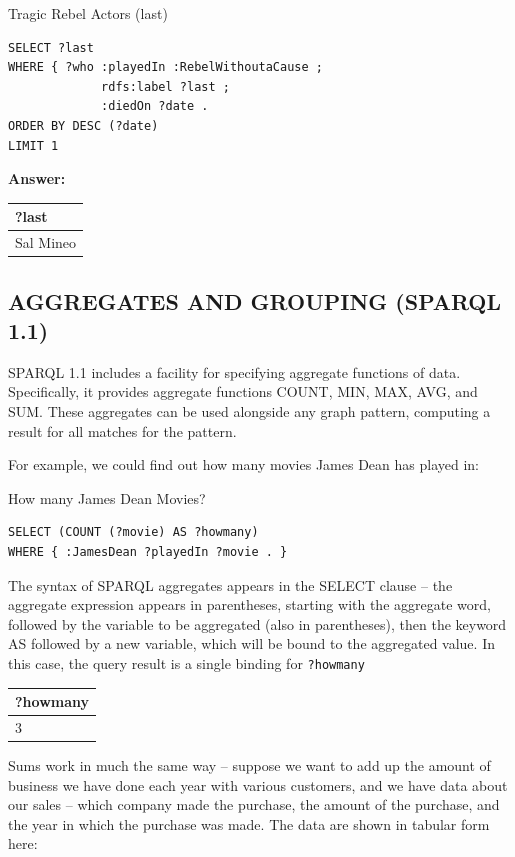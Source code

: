 \begin{query}Tragic Rebel Actors (last)\end{query}

\begin{lstlisting}
SELECT ?last
WHERE { ?who :playedIn :RebelWithoutaCause ;
             rdfs:label ?last ;
             :diedOn ?date .
ORDER BY DESC (?date)
LIMIT 1
\end{lstlisting}

\textbf{\textbf{Answer:}}

\begin{tabular}{|l|}
\hline
?last\\
\hline
Sal Mineo\\
\hline
\end{tabular}

\subsection{AGGREGATES AND GROUPING (SPARQL 1.1)}

SPARQL 1.1 includes a facility for specifying aggregate functions of
data. Specifically, it provides aggregate functions COUNT, MIN, MAX,
AVG, and SUM. These aggregates can be used alongside any graph pattern,
computing a result for all matches for the pattern.

For example, we could find out how many movies James Dean has played in:

\begin{query}How many James Dean Movies?\end{query}
\begin{lstlisting}
SELECT (COUNT (?movie) AS ?howmany)
WHERE { :JamesDean ?playedIn ?movie . }
\end{lstlisting}


The syntax of SPARQL aggregates appears in the SELECT clause -- the
aggregate expression appears in parentheses, starting with the aggregate
word, followed by the variable to be aggregated (also in parentheses),
then the keyword AS followed by a new variable, which will be bound to
the aggregated value. In this case, the query result is a single binding
for \texttt{?howmany}

\begin{tabular}{|l|}
\hline
?howmany\\
\hline
3\\
\hline
\end{tabular}

Sums work in much the same way -- suppose we want to add up the amount
of business we have done each year with various customers, and we have
data about our sales -- which company made the purchase, the amount of
the purchase, and the year in which the purchase was made. The data are
shown in tabular form here:


